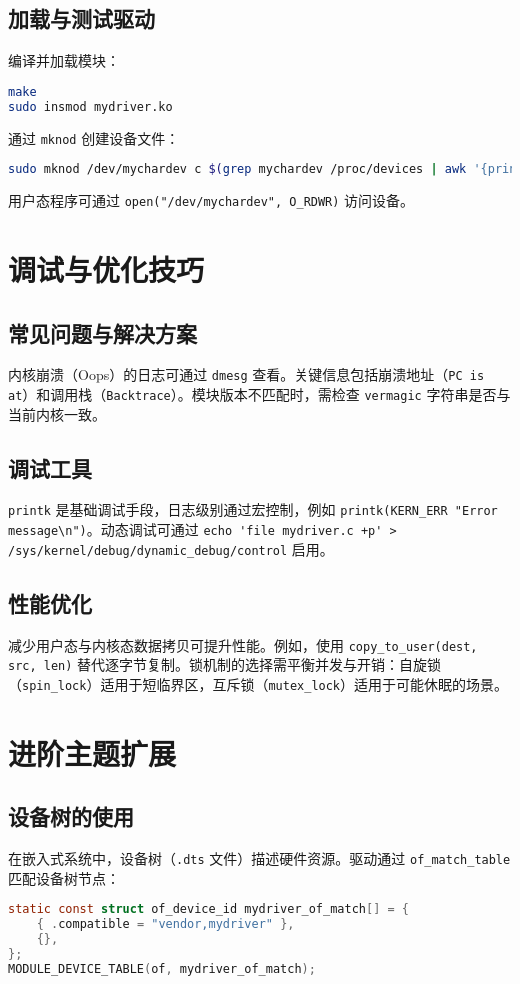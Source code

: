 \section{加载与测试驱动}
编译并加载模块：\par
\begin{lstlisting}[language=bash]
make  
sudo insmod mydriver.ko  
\end{lstlisting}
通过 \verb!mknod! 创建设备文件：\par
\begin{lstlisting}[language=bash]
sudo mknod /dev/mychardev c $(grep mychardev /proc/devices | awk '{print $1}') 0  
\end{lstlisting}
用户态程序可通过 \verb!open("/dev/mychardev", O_RDWR)! 访问设备。\par
\chapter{调试与优化技巧}
\section{常见问题与解决方案}
内核崩溃（Oops）的日志可通过 \verb!dmesg! 查看。关键信息包括崩溃地址（\verb!PC is at!）和调用栈（\verb!Backtrace!）。模块版本不匹配时，需检查 \verb!vermagic! 字符串是否与当前内核一致。\par
\section{调试工具}
\verb!printk! 是基础调试手段，日志级别通过宏控制，例如 \verb!printk(KERN_ERR "Error message\n")!。动态调试可通过 \verb!echo 'file mydriver.c +p' > /sys/kernel/debug/dynamic_debug/control! 启用。\par
\section{性能优化}
减少用户态与内核态数据拷贝可提升性能。例如，使用 \verb!copy_to_user(dest, src, len)! 替代逐字节复制。锁机制的选择需平衡并发与开销：自旋锁（\verb!spin_lock!）适用于短临界区，互斥锁（\verb!mutex_lock!）适用于可能休眠的场景。\par
\chapter{进阶主题扩展}
\section{设备树的使用}
在嵌入式系统中，设备树（\verb!.dts! 文件）描述硬件资源。驱动通过 \verb!of_match_table! 匹配设备树节点：\par
\begin{lstlisting}[language=c]
static const struct of_device_id mydriver_of_match[] = {  
    { .compatible = "vendor,mydriver" },  
    {},  
};  
MODULE_DEVICE_TABLE(of, mydriver_of_match);  
\end{lstlisting}
